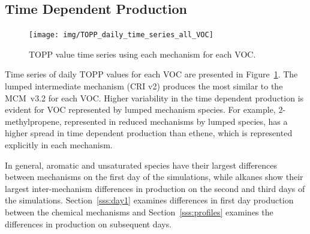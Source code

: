 \subsection[Time Dependent Ox Production]{Time Dependent  Production}
%
\begin{figure}
    \centering
    \texttt{[image: img/TOPP\_daily\_time\_series\_all\_VOC]}
    \vspace{0mm}
    \caption{TOPP value time series using each mechanism for each VOC.}
    \vspace{-4mm}
    \label{f:TOPP_dailies}
\end{figure}
%
Time series of daily TOPP values for each VOC are presented in \mbox{Figure \ref{f:TOPP_dailies}}. 
The lumped intermediate mechanism (CRI v2) produces the most similar  to the \mbox{MCM v3.2} for each VOC.
Higher variability in the time dependent  production is evident for VOC represented by lumped mechanism species.
For example, $2$-methylpropene, represented in reduced mechanisms by lumped species, has a higher spread in time dependent  production than ethene, which is represented explicitly in each mechanism.

In general, aromatic and unsaturated species have their largest differences between mechanisms on the first day of the simulations, while alkanes show their largest inter-mechanism differences in  production on the second and third days of the simulations.
\mbox{Section \ref{sss:day1}} examines differences in first day  production between the chemical mechanisms and \mbox{Section \ref{sss:profiles}} examines the differences in  production on subsequent days.
%
